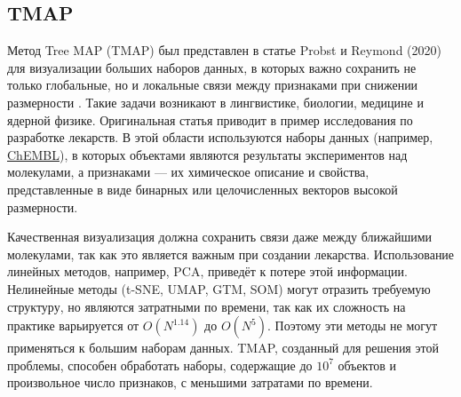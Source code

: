 \documentclass[10pt, a4paper]{extarticle}
\begin{document}
\subsection{TMAP}
Метод Tree MAP (TMAP) был представлен в статье Probst и Reymond (2020) для визуализации больших наборов данных, в которых важно сохранить не только глобальные, но и локальные связи между признаками при снижении размерности \cite{tmap}. Такие задачи возникают в лингвистике, биологии, медицине и ядерной физике. Оригинальная статья приводит в пример исследования по разработке лекарств. В этой области используются наборы данных (например, \href{https://www.ebi.ac.uk/chembl/}{ChEMBL}), в которых объектами являются результаты экспериментов над молекулами, а признаками — их химическое описание и свойства, представленные в виде бинарных или целочисленных векторов высокой размерности. 

Качественная визуализация должна сохранить связи даже между ближайшими молекулами, так как это является важным при создании лекарства. 
Использование линейных методов, например, PCA, приведёт к потере этой информации. 
Нелинейные методы (t-SNE, UMAP, GTM, SOM) могут отразить требуемую структуру, но являются затратными по времени, так как их сложность на практике варьируется от $O(N^{1.14})$ до $O(N^5)$. Поэтому эти методы не могут применяться к большим наборам данных. 
TMAP, созданный для решения этой проблемы, способен обработать наборы, содержащие до $10^7$ объектов и произвольное число признаков, с меньшими затратами по времени.
\end{document}
